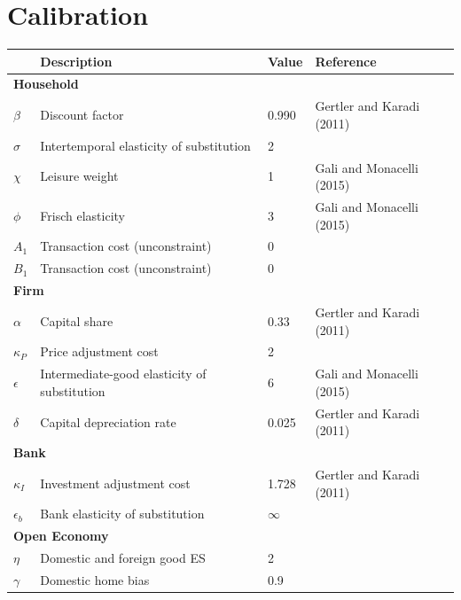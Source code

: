 \documentclass[12pt]{article}
\begin{document}
\clearpage
\section{Calibration}

\begin{table}[h!]
\centering
\begin{tabular}{llll}
\hline\hline
 & Description & Value & Reference \\ \hline
\multicolumn{4}{l}{\bf Household}     \\
$\beta$    & Discount factor       & 0.990  & Gertler and Karadi (2011)                   					 \\
$\sigma$     & Intertemporal elasticity of substitution     & 2      \\
$\chi$       & Leisure weight     & 1  & Gali and Monacelli (2015)                                    \\
$\phi$        & Frisch elasticity      & 3     & Gali and Monacelli (2015)                                 \\
$A_1$      & Transaction cost (unconstraint)   & 0              	     \\
$B_1$     & Transaction cost (unconstraint)   & 0                   	 \\
\multicolumn{4}{l}{\bf Firm}     \\
$\alpha$     & Capital share    & 0.33        &  Gertler and Karadi (2011)                       			\\
$\kappa_P$     & Price adjustment cost   & 2                                                      \\
$\epsilon$       & Intermediate-good elasticity of substitution  & 6  &   Gali and Monacelli (2015)       \\
$\delta$       & Capital depreciation rate        & 0.025   & Gertler and Karadi (2011)                                             \\
\multicolumn{4}{l}{\bf Bank}     \\
$\kappa_I$         & Investment adjustment cost        & 1.728       & Gertler and Karadi (2011)                            \\
$\epsilon_b$      & Bank elasticity of substitution    & $\infty$                                     \\
\multicolumn{4}{l}{\bf Open Economy}     \\     
$\eta$      & Domestic and foreign good ES     & 2                        \\
$\gamma$     & Domestic home bias           & 0.9                                                 \\

\end{tabular}
\end{table}
\end{document}
